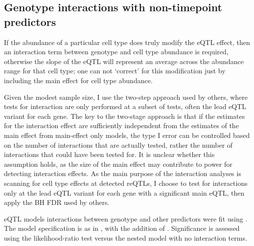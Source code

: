 \subsection{Genotype interactions with non-timepoint predictors}

If the abundance of a particular cell type does truly modify the \gls{eQTL} effect, 
then an interaction term between genotype and cell type abundance is required, 
otherwise the slope of the \gls{eQTL} will represent an average across the abundance range for that cell type;
one can not \enquote*{correct} for this modification just by including the main effect for cell type abundance.

Given the modest sample size, I use the two-step approach used by others\autocite{westra2015CellSpecificEQTL,peters2016InsightGenotypePhenotypeAssociations,kim-hellmuth2017GeneticRegulatoryEffects,davenport2018DiscoveringVivoCytokineeQTL},
where tests for interaction are only performed at a subset of tests, often the lead \gls{eQTL} variant for each gene.
%
%
The key to the two-stage approach is that if the estimates for the interaction effect are sufficiently independent from the estimates of the main effect from main-effect only models,
the type I error can be controlled based on the number of interactions that are actually tested, rather the number of interactions that could have been tested for\autocite{kooperberg2008IncreasingPowerIdentifying,peters2016InsightGenotypePhenotypeAssociations}.
It is unclear whether this assumption holds, as the size of the main effect may contribute to power for detecting interaction effects.
As the main purpose of the interaction analyses is scanning for cell type effects at detected \glspl{reQTL},
I choose to test for interactions only at the lead \gls{eQTL} variant for each gene with a significant main \gls{eQTL},
then apply the \gls{BH} \gls{FDR} used by others\autocite{peters2016InsightGenotypePhenotypeAssociations,kim-hellmuth2017GeneticRegulatoryEffects}.

\gls{eQTL} models interactions between genotype and other predictors were fit using .
The model specification is as in , with the addition of .
Significance is assessed using the likelihood-ratio test versus the nested model with no interaction terms.

